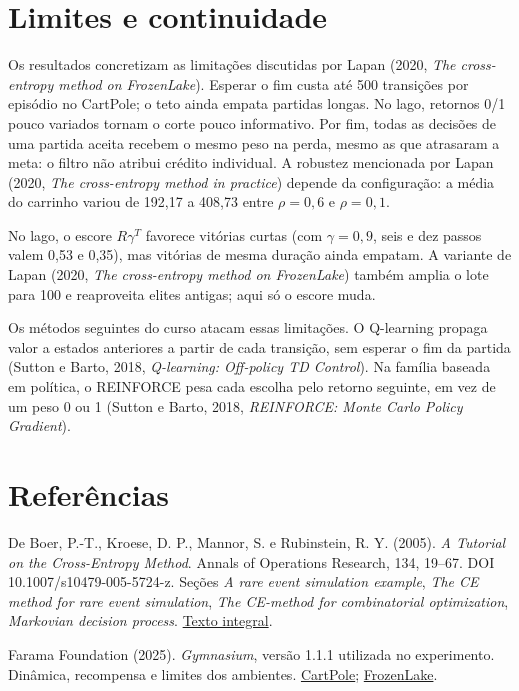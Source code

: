 \documentclass[12pt]{article}
\begin{document}
\section{Limites e continuidade}

Os resultados concretizam as limitações discutidas por Lapan (2020, \emph{The cross-entropy method on FrozenLake}). Esperar o fim custa até 500 transições por episódio no CartPole; o teto ainda empata partidas longas. No lago, retornos 0/1 pouco variados tornam o corte pouco informativo. Por fim, todas as decisões de uma partida aceita recebem o mesmo peso na perda, mesmo as que atrasaram a meta: o filtro não atribui crédito individual. A robustez mencionada por Lapan (2020, \emph{The cross-entropy method in practice}) depende da configuração: a média do carrinho variou de 192,17 a 408,73 entre $\rho=0{,}6$ e $\rho=0{,}1$.

No lago, o escore $R\gamma^T$ favorece vitórias curtas (com $\gamma=0{,}9$, seis e dez passos valem 0,53 e 0,35), mas vitórias de mesma duração ainda empatam. A variante de Lapan (2020, \emph{The cross-entropy method on FrozenLake}) também amplia o lote para 100 e reaproveita elites antigas; aqui só o escore muda.

Os métodos seguintes do curso atacam essas limitações. O Q-learning propaga valor a estados anteriores a partir de cada transição, sem esperar o fim da partida (Sutton e Barto, 2018, \emph{Q-learning: Off-policy TD Control}). Na família baseada em política, o REINFORCE pesa cada escolha pelo retorno seguinte, em vez de um peso 0 ou 1 (Sutton e Barto, 2018, \emph{REINFORCE: Monte Carlo Policy Gradient}).

\section*{Referências}
\small

\noindent De Boer, P.-T., Kroese, D. P., Mannor, S. e Rubinstein, R. Y. (2005). \emph{A Tutorial on the Cross-Entropy Method}. Annals of Operations Research, 134, 19--67. DOI 10.1007/s10479-005-5724-z. Seções \emph{A rare event simulation example}, \emph{The CE method for rare event simulation}, \emph{The CE-method for combinatorial optimization}, \emph{Markovian decision process}. \href{https://ris.utwente.nl/ws/portalfiles/portal/6700787/fulltext.pdf}{Texto integral}.\par\smallskip

\noindent Farama Foundation (2025). \emph{Gymnasium}, versão 1.1.1 utilizada no experimento. Dinâmica, recompensa e limites dos ambientes. \href{https://gymnasium.farama.org/environments/classic_control/cart_pole/}{CartPole}; \href{https://gymnasium.farama.org/environments/toy_text/frozen_lake/}{FrozenLake}.\par\smallskip
\end{document}
